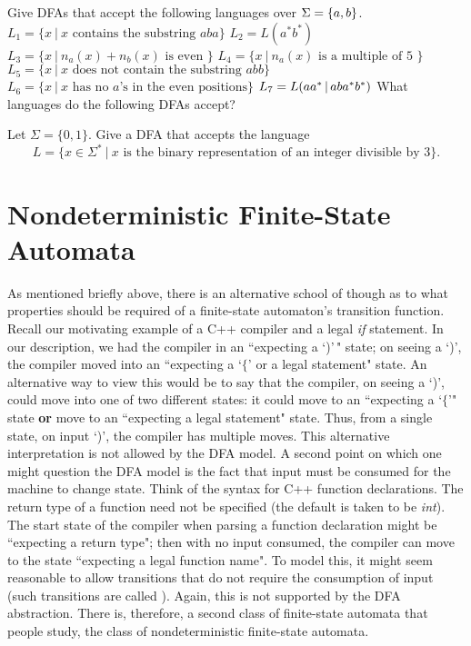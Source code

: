 \begin{exercises}
\problem Give DFAs that accept the following languages over $\Sigma =\mbox{$\{a,b\}$}$.
\ppart $L_1= \{ x \ | \ x \mbox{ contains the substring } aba\}$
\ppart $L_2= L(a^*b^*)$
\ppart $L_3= \{ x \ | \ n_a(x)+n_b(x) \mbox{ is even }\}$
\ppart $L_4= \{ x \ | \ n_a(x) \mbox{ is a multiple of 5 }\}$
\ppart $L_5= \{ x \ | \ x \mbox{ does not contain the substring } abb\}$
\ppart $L_6= \{ x \ | \ x \mbox{ has no $a$'s in the even positions} \}$
\ppart $L_7 = L(aa^* \hbox{$\,|\,$}  aba^*b^*)$
\problem What languages do the following DFAs accept?

\fsafig{1ex}

\fsafig{2ex}


\problem Let $\Sigma=\{0,1\}$. Give a DFA that accepts the language 
$$ L = \{ x \in \Sigma^* \ | \ x \mbox{ is the binary representation of an integer
divisible by 3}\}.$$ 

\end{exercises}



\section{Nondeterministic Finite-State Automata}\label{S-fsa-2}

As mentioned briefly above, there is an alternative school of though as to what
properties should be required of a finite-state automaton's transition function.
Recall our motivating example of a C++ compiler and a legal {\em if} statement. 
In our description, we had the compiler in an ``expecting a `)'$\,$" state; on
seeing a `)', the compiler moved into an ``expecting a `$\{$' or a legal
statement" state.  An alternative way to view this would be to say that the
compiler, on seeing a `)', could move into one of two different states: it could
move to an ``expecting a `$\{$'" state {\bf or} move to an ``expecting a legal
statement" state. Thus, from a single state, on input `)', the compiler has
multiple moves.  This alternative interpretation is not
allowed by the DFA model.  A second point on which one 
might question the DFA model is the fact that input must be consumed for the
machine to change state.
Think of the syntax for C++ function declarations.  The return type of a
function need not be specified (the default is taken to be {\em int}).  The
start state of the compiler when parsing a function declaration might be 
``expecting a return type"; then with no
input consumed, the compiler can move to the state ``expecting a legal function 
name".  To model this, it might seem reasonable to allow transitions that do 
not require
the consumption of input (such transitions are called ).  
Again, this is not supported by the DFA abstraction.
There is, therefore, a second class of finite-state automata that people
study, the class of nondeterministic finite-state automata.  

